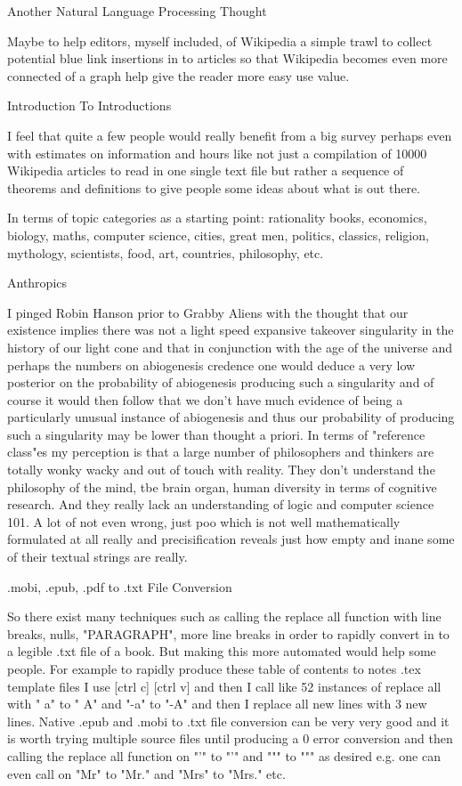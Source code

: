 	Another Natural Language Processing Thought

Maybe to help editors, myself included, of Wikipedia a simple trawl to collect potential blue link insertions in to articles so that Wikipedia becomes even more connected of a graph help give the reader more easy use value.

	Introduction To Introductions

I feel that quite a few people would really benefit from a big survey perhaps even with estimates on information and hours like not just a compilation of 10000 Wikipedia articles to read in one single text file but rather a sequence of theorems and definitions to give people some ideas about what is out there.

In terms of topic categories as a starting point: rationality books, economics, biology, maths, computer science, cities, great men, politics, classics, religion, mythology, scientists, food, art, countries, philosophy, etc.

	Anthropics

I pinged Robin Hanson prior to Grabby Aliens with the thought that our existence implies there was not a light speed expansive takeover singularity in the history of our light cone and that in conjunction with the age of the universe and perhaps the numbers on abiogenesis credence one would deduce a very low posterior on the probability of abiogenesis producing such a singularity and of course it would then follow that we don't have much evidence of being a particularly unusual instance of abiogenesis and thus our probability of producing such a singularity may be lower than thought a priori. In terms of "reference class"es my perception is that a large number of philosophers and thinkers are totally wonky wacky and out of touch with reality. They don't understand the philosophy of the mind, tbe brain organ, human diversity in terms of cognitive research. And they really lack an understanding of logic and computer science 101. A lot of not even wrong, just poo which is not well mathematically formulated at all really and precisification reveals just how empty and inane some of their textual strings are really.

	.mobi, .epub, .pdf to .txt File Conversion

So there exist many techniques such as calling the replace all function with line breaks, nulls, "PARAGRAPH", more line breaks in order to rapidly convert in to a legible .txt file of a book. But making this more automated would help some people. For example to rapidly produce these table of contents to notes .tex template files I use [ctrl c] [ctrl v] and then I call like 52 instances of replace all with " a" to " A" and "-a" to "-A" and then I replace all new lines with 3 new lines. Native .epub and .mobi to .txt file conversion can be very very good and it is worth trying multiple source files until producing a 0 error conversion and then calling the replace all function on "'" to "'" and """ to """ as desired e.g. one can even call on "Mr" to "Mr." and "Mrs" to "Mrs." etc.